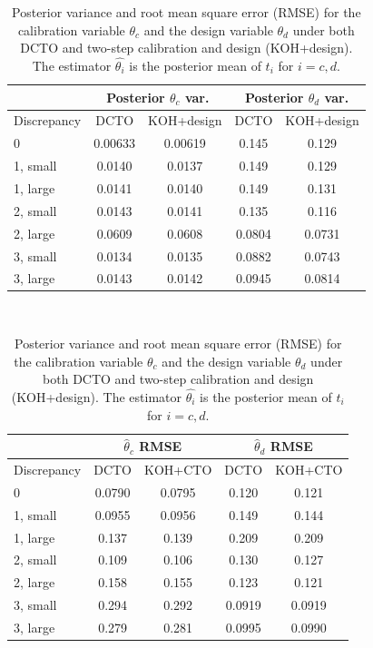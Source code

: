 \documentclass[12pt]{article}
\begin{document}
\begin{table}[]
	\centering
	\begin{tabular}{l|cc|cc}
		&\multicolumn{2}{c|}{Posterior $\theta_c$ var.}&
		\multicolumn{2}{c}{Posterior $\theta_d$ var.} \\ \hline
		Discrepancy    & DCTO   & KOH+design & DCTO    & KOH+design   \\ \hline
		0              & 0.00633 & 0.00619 & 0.145 & 0.129\\ \hline
		1, small       & 0.0140 & 0.0137 & 0.149 & 0.129\\ \hline
		1, large       & 0.0141 & 0.0140 & 0.149 & 0.131\\ \hline
		2, small       & 0.0143 & 0.0141 & 0.135 & 0.116\\ \hline
		2, large       & 0.0609 & 0.0608 & 0.0804 & 0.0731\\ \hline
		3, small       & 0.0134 & 0.0135 & 0.0882 & 0.0743\\ \hline
		3, large       & 0.0143 & 0.0142 & 0.0945 & 0.0814\\ \hline
	\end{tabular}\\
	\vspace{.25in}
	\begin{tabular}{l|cc|cc}
		&\multicolumn{2}{c|}{$\widehat\theta_c$ RMSE}&
		\multicolumn{2}{c}{$\widehat\theta_d$ RMSE} \\ \hline
		Discrepancy    & DCTO   & KOH+CTO & DCTO    & KOH+CTO   \\ \hline
		0              & 0.0790 & 0.0795 & 0.120 & 0.121\\ \hline
		1, small       & 0.0955 & 0.0956 & 0.149 & 0.144\\ \hline
		1, large       & 0.137 & 0.139 & 0.209 & 0.209\\ \hline
		2, small       & 0.109 & 0.106 & 0.130 & 0.127\\ \hline
		2, large       & 0.158 & 0.155 & 0.123 & 0.121\\ \hline
		3, small       & 0.294 & 0.292 & 0.0919 & 0.0919\\ \hline
		3, large       & 0.279 & 0.281 & 0.0995 & 0.0990\\ \hline
	\end{tabular}
	\caption{Posterior variance and root mean square error (RMSE) for the calibration variable $\theta_c$ and the design variable $\theta_d$ under both DCTO and two-step calibration and design (KOH+design). The estimator $\widehat{\theta_i}$ is the posterior mean of $t_i$ for $i=c,d$.} 
	\label{table:vars_and_rmses}
\end{table}
\end{document}
